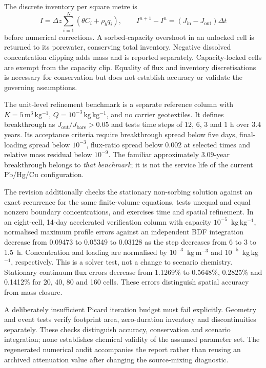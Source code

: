 The discrete inventory per square metre is
\begin{equation}
 I=\Delta z\sum_{i=1}^{N}(\theta C_i+\rho_bq_i),\qquad
 I^{n+1}-I^n=(J_{\mathrm{in}}-J_{\mathrm{out}})\Delta t
 \label{eq:column_inventory}
\end{equation}
before numerical corrections. A sorbed-capacity overshoot in an unlocked cell is returned to its porewater, conserving total inventory. Negative dissolved concentration clipping adds mass and is reported separately. Capacity-locked cells are exempt from the capacity clip. Equality of flux and inventory discretisations is necessary for conservation but does not establish accuracy or validate the governing assumptions.

The unit-level refinement benchmark is a separate reference column with $K=5\,\mathrm{m^3\,kg^{-1}}$, $Q=10^{-3}\,\mathrm{kg\,kg^{-1}}$, and no carrier geotextiles. It defines breakthrough as $J_{\mathrm{out}}/J_{\mathrm{bare}}>0.05$ and tests time steps of $12$, $6$, $3$ and $1$ h over $3.4$ years. Its acceptance criteria require breakthrough spread below five days, final-loading spread below $10^{-3}$, flux-ratio spread below $0.002$ at selected times and relative mass residual below $10^{-9}$. The familiar approximately $3.09$-year breakthrough belongs to \emph{that benchmark}; it is not the service life of the current Pb/Hg/Cu configuration.\cite{repository}

The revision additionally checks the stationary non-sorbing solution against an exact recurrence for the same finite-volume equations, tests unequal and equal nonzero boundary concentrations, and exercises time and spatial refinement. In an eight-cell, 14-day accelerated verification column with capacity $10^{-5}$~kg\,kg$^{-1}$, normalised maximum profile errors against an independent BDF integration decrease from 0.09473 to 0.05349 to 0.03128 as the step decreases from 6 to 3 to 1.5~h. Concentration and loading are normalised by $10^{-3}$~kg\,m$^{-3}$ and $10^{-5}$~kg\,kg$^{-1}$, respectively. This is a solver test, not a change to scenario chemistry. Stationary continuum flux errors decrease from 1.1269\% to 0.5648\%, 0.2825\% and 0.1412\% for 20, 40, 80 and 160 cells. These errors distinguish spatial accuracy from mass closure.

A deliberately insufficient Picard iteration budget must fail explicitly. Geometry and event tests verify footprint area, zero-duration inventory and discontinuities separately. These checks distinguish accuracy, conservation and scenario integration; none establishes chemical validity of the assumed parameter set. The regenerated numerical audit accompanies the report rather than reusing an archived attenuation value after changing the source-mixing diagnostic.

